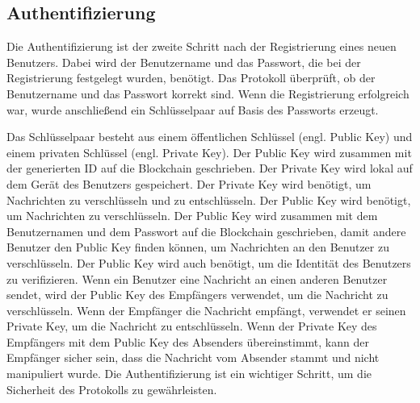 \subsection{Authentifizierung}

Die Authentifizierung ist der zweite Schritt nach der Registrierung eines neuen Benutzers. 
Dabei wird der Benutzername und das Passwort, die bei der Registrierung festgelegt wurden,
benötigt. Das Protokoll überprüft, ob der Benutzername und das Passwort korrekt sind. %
Wenn die Registrierung erfolgreich war, wurde anschließend ein Schlüsselpaar auf Basis des Passworts erzeugt.

Das Schlüsselpaar besteht aus einem öffentlichen Schlüssel (engl. Public Key) und einem privaten Schlüssel 
(engl. Private Key). Der Public Key wird zusammen mit
der generierten ID auf die Blockchain geschrieben. Der Private Key wird lokal auf dem
Gerät des Benutzers gespeichert. Der Private Key wird benötigt, um Nachrichten zu verschlüsseln und
zu entschlüsseln. Der Public Key wird benötigt, um Nachrichten zu verschlüsseln. Der Public Key wird
zusammen mit dem Benutzernamen und dem Passwort auf die Blockchain geschrieben, damit andere Benutzer
den Public Key finden können, um Nachrichten an den Benutzer zu verschlüsseln. Der Public Key wird
auch benötigt, um die Identität des Benutzers zu verifizieren. Wenn ein Benutzer eine Nachricht an
einen anderen Benutzer sendet, wird der Public Key des Empfängers verwendet, um die Nachricht zu
verschlüsseln. Wenn der Empfänger die Nachricht empfängt, verwendet er seinen Private Key, um die
Nachricht zu entschlüsseln. Wenn der Private Key des Empfängers mit dem Public Key des Absenders
übereinstimmt, kann der Empfänger sicher sein, dass die Nachricht vom Absender stammt und nicht
manipuliert wurde.
Die Authentifizierung ist ein wichtiger Schritt, um die Sicherheit des Protokolls zu gewährleisten.